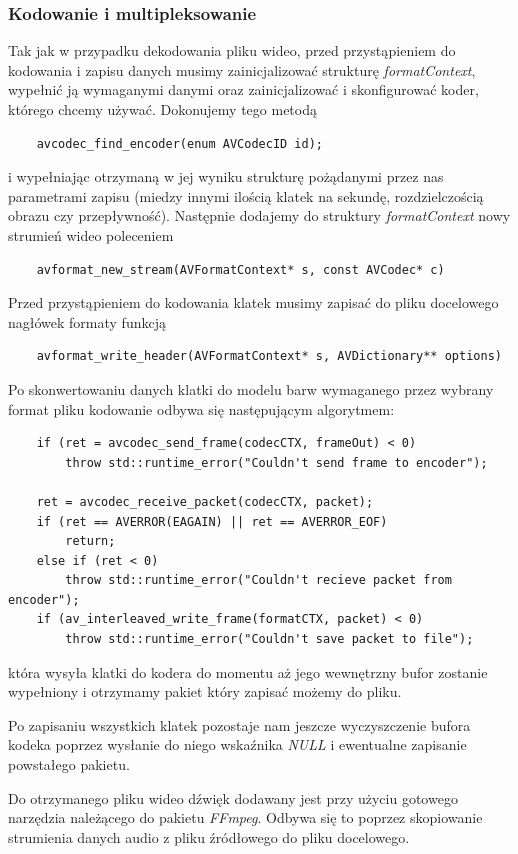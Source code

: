 \documentclass[twoside]{projektInzynierskiMS}
\begin{document}
\subsubsection{Kodowanie i multipleksowanie}
Tak jak w przypadku dekodowania pliku wideo, przed przystąpieniem do kodowania i zapisu danych musimy zainicjalizować strukturę \emph{formatContext}, wypełnić ją wymaganymi danymi oraz zainicjalizować i skonfigurować koder, którego chcemy używać. Dokonujemy tego metodą
\begin{verbatim}
	avcodec_find_encoder(enum AVCodecID id);
\end{verbatim}
i wypełniając otrzymaną w jej wyniku strukturę pożądanymi przez nas parametrami zapisu (miedzy innymi ilością klatek na sekundę, rozdzielczością obrazu czy przepływność). Następnie dodajemy do struktury \emph{formatContext} nowy strumień wideo poleceniem 
\begin{verbatim}
	avformat_new_stream(AVFormatContext* s, const AVCodec* c) 	
\end{verbatim}
Przed przystąpieniem do kodowania klatek musimy zapisać do pliku docelowego nagłówek formaty funkcją
\begin{verbatim}
	avformat_write_header(AVFormatContext* s, AVDictionary** options) 	
\end{verbatim}
Po skonwertowaniu danych klatki do modelu barw wymaganego przez wybrany format pliku kodowanie odbywa się następującym algorytmem: 
\begin{verbatim}
	if (ret = avcodec_send_frame(codecCTX, frameOut) < 0)
	    throw std::runtime_error("Couldn't send frame to encoder");
	
	ret = avcodec_receive_packet(codecCTX, packet);
	if (ret == AVERROR(EAGAIN) || ret == AVERROR_EOF)
	    return;
	else if (ret < 0)
	    throw std::runtime_error("Couldn't recieve packet from encoder");
	if (av_interleaved_write_frame(formatCTX, packet) < 0)
	    throw std::runtime_error("Couldn't save packet to file");
\end{verbatim}
która wysyła klatki do kodera do momentu aż jego wewnętrzny bufor zostanie wypełniony i otrzymamy pakiet który zapisać możemy do pliku.

Po zapisaniu wszystkich klatek pozostaje nam jeszcze wyczyszczenie bufora kodeka poprzez wysłanie do niego wskaźnika \emph{NULL} i ewentualne zapisanie powstałego pakietu.

Do otrzymanego pliku wideo dźwięk dodawany jest przy użyciu gotowego narzędzia należącego do pakietu \emph{FFmpeg}. Odbywa się to poprzez skopiowanie strumienia danych audio z pliku źródłowego do pliku docelowego.
\end{document}
